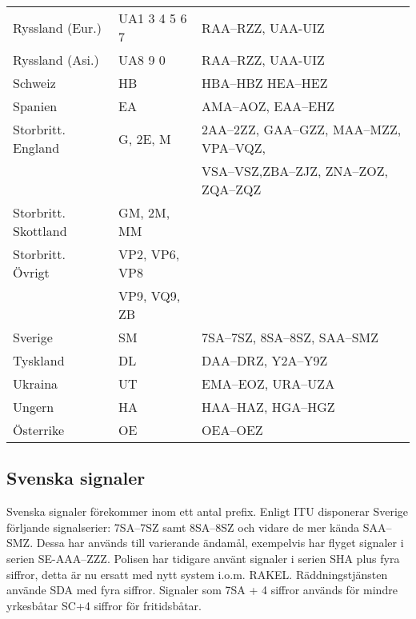 \begin{center}
\begin{footnotesize}
\begin{longtable}{lll}
			Ryssland (Eur.)      & UA1 3 4 5 6 7  & RAA--RZZ, UAA-UIZ                                 \\
			Ryssland (Asi.)      & UA8 9 0        & RAA--RZZ, UAA-UIZ                                 \\
			Schweiz              & HB             & HBA--HBZ HEA--HEZ                                 \\
			Spanien              & EA             & AMA--AOZ, EAA--EHZ                                \\
			Storbritt. England   & G, 2E, M       & 2AA--2ZZ, GAA--GZZ, MAA--MZZ, VPA--VQZ,           \\
			                     &                & VSA--VSZ,ZBA--ZJZ, ZNA--ZOZ, ZQA--ZQZ             \\
			Storbritt. Skottland & GM, 2M, MM     &                                                   \\
			Storbritt. Övrigt    & VP2, VP6, VP8  &                                                   \\
			                     & VP9, VQ9, ZB   &                                                   \\
			Sverige              & SM             & 7SA--7SZ, 8SA--8SZ, SAA--SMZ                      \\
			Tyskland             & DL             & DAA--DRZ, Y2A--Y9Z                                \\
			Ukraina              & UT             & EMA--EOZ, URA--UZA                                \\
			Ungern               & HA             & HAA--HAZ, HGA--HGZ                                \\
			Österrike            & OE             & OEA--OEZ                                          \\
		\end{longtable}
	\end{footnotesize}
\end{center}

\subsection{Svenska signaler}

Svenska signaler förekommer inom ett antal prefix. Enligt ITU disponerar Sverige
förljande signalserier: 7SA--7SZ samt 8SA--8SZ och vidare de mer kända SAA--SMZ.
Dessa har används till varierande ändamål, exempelvis har flyget signaler i
serien SE-AAA--ZZZ. Polisen har tidigare använt signaler i serien SHA plus fyra
siffror, detta är nu ersatt med nytt system i.o.m. RAKEL. Räddningstjänsten
använde SDA med fyra siffror. Signaler som 7SA + 4 siffror används för mindre
yrkesbåtar SC+4 siffror för fritidsbåtar.

